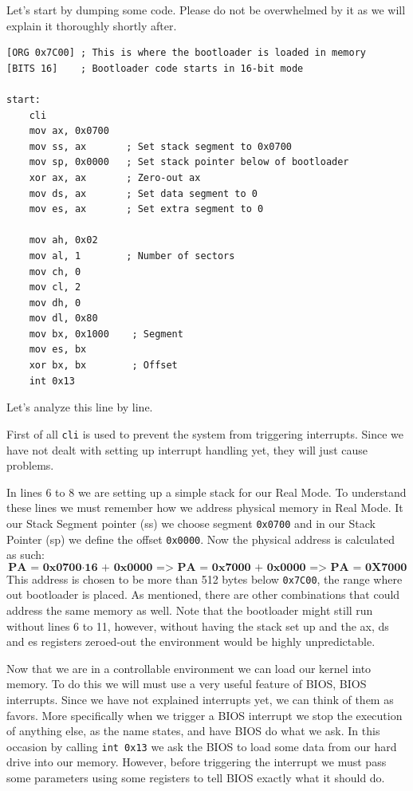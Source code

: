 Let's start by dumping some code. Please do not be overwhelmed by it as we will explain it thoroughly shortly after.

\begin{lstlisting}[caption={Simple bootloader start in assembly}]
[ORG 0x7C00] ; This is where the bootloader is loaded in memory
[BITS 16]    ; Bootloader code starts in 16-bit mode

start:
    cli
    mov ax, 0x0700
    mov ss, ax       ; Set stack segment to 0x0700
    mov sp, 0x0000   ; Set stack pointer below of bootloader
    xor ax, ax       ; Zero-out ax
    mov ds, ax       ; Set data segment to 0
    mov es, ax       ; Set extra segment to 0

    mov ah, 0x02
    mov al, 1        ; Number of sectors
    mov ch, 0
    mov cl, 2
    mov dh, 0
    mov dl, 0x80
    mov bx, 0x1000    ; Segment
    mov es, bx
    xor bx, bx        ; Offset
    int 0x13
\end{lstlisting}
    
Let's analyze this line by line. 

First of all \texttt{cli} is used to prevent the system from triggering interrupts.
Since we have not dealt with setting up interrupt handling yet, they will just cause problems.

In lines 6 to 8 we are setting up a simple stack for our Real Mode. To understand these lines we must
remember how we address physical memory in Real Mode. It our Stack Segment pointer (ss) we choose segment \texttt{0x0700}
and in our Stack Pointer (sp) we define the offset \texttt{0x0000}. Now the physical address is calculated as such:
\[
\textbf{PA = 0x0700} \cdot \textbf{16 + 0x0000}
\textbf{ => PA = 0x7000 + 0x0000}
\textbf{    => PA = 0X7000}
\]
This address is chosen to be more than 512 bytes below \texttt{0x7C00}, the range where out bootloader is placed.
As mentioned, there are other combinations that could address the same memory as well.
Note that the bootloader might still run without lines 6 to 11, however, without having the stack set up
and the ax, ds and es registers zeroed-out the environment would be highly unpredictable.

Now that we are in a controllable environment we can load our kernel into memory. To do this we will must use
a very useful feature of BIOS, BIOS interrupts. Since we have not explained interrupts yet, we can think of them
as favors. More specifically when we trigger a BIOS interrupt we stop the execution of anything else, as the name states,
and have BIOS do what we ask. In this occasion by calling \texttt{int 0x13} we ask the BIOS to load some data from our
hard drive into our memory. However, before triggering the interrupt we must pass some parameters using some registers to 
tell BIOS exactly what it should do.

